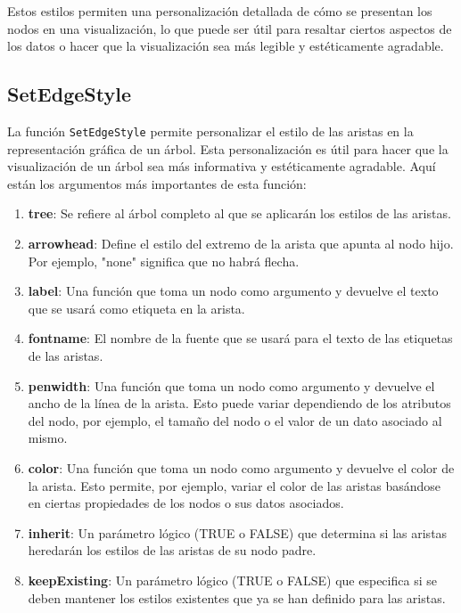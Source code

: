 \documentclass[12pt]{report}\usepackage[]{graphicx}\usepackage[dvipsnames]{xcolor}
\begin{document}
 	Estos estilos permiten una personalización detallada de cómo se presentan los nodos en una visualización, lo que puede ser útil para resaltar ciertos aspectos de los datos o hacer que la visualización sea más legible y estéticamente agradable.
 	
 	\subsection{SetEdgeStyle}
 	
 	La función \texttt{SetEdgeStyle} permite personalizar el estilo de las aristas en la representación gráfica de un árbol. Esta personalización es útil para hacer que la visualización de un árbol sea más informativa y estéticamente agradable. Aquí están los argumentos más importantes de esta función:
 	
 	\begin{enumerate}
 		\item \textbf{tree}: Se refiere al árbol completo al que se aplicarán los estilos de las aristas.
 		
 		\item \textbf{arrowhead}: Define el estilo del extremo de la arista que apunta al nodo hijo. Por ejemplo, "none" significa que no habrá flecha.
 		
 		\item \textbf{label}: Una función que toma un nodo como argumento y devuelve el texto que se usará como etiqueta en la arista.
 		
 		\item \textbf{fontname}: El nombre de la fuente que se usará para el texto de las etiquetas de las aristas.
 		
 		\item \textbf{penwidth}: Una función que toma un nodo como argumento y devuelve el ancho de la línea de la arista. Esto puede variar dependiendo de los atributos del nodo, por ejemplo, el tamaño del nodo o el valor de un dato asociado al mismo.
 		
 		\item \textbf{color}: Una función que toma un nodo como argumento y devuelve el color de la arista. Esto permite, por ejemplo, variar el color de las aristas basándose en ciertas propiedades de los nodos o sus datos asociados.
 		
 		\item \textbf{inherit}: Un parámetro lógico (TRUE o FALSE) que determina si las aristas heredarán los estilos de las aristas de su nodo padre.
 		
 		\item \textbf{keepExisting}: Un parámetro lógico (TRUE o FALSE) que especifica si se deben mantener los estilos existentes que ya se han definido para las aristas.
 	\end{enumerate}
 	
\end{document}
